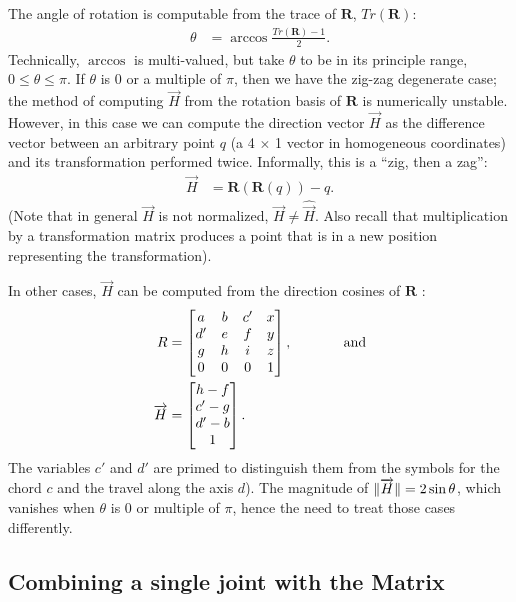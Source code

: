 \documentclass[mathematics,article,submit,pdftex,moreauthors]{Definitions/mdpi}
\DeclarePairedDelimiter{\norm}{\lVert}{\rVert}
\begin{document}
The angle of rotation is computable from the trace of $\bm{R}$, $Tr(\bm{R})$:
\begin{align}
  \theta &= \arccos{\frac{Tr(\bm{R}) - 1}{2}}.
\end{align}
Technically, $\arccos$ is multi-valued, but take $\theta$
to be in its principle range, $0 \leq \theta \leq \pi$.
If $\theta$ is $0$ or a multiple of $\pi$, then we have the zig-zag
degenerate case; the method of computing $\overrightarrow{H}$ from the rotation
basis of $\bm{R}$ is numerically unstable.
However, in this case
we can compute the direction vector $\overrightarrow{H}$ as the difference vector
between an arbitrary point $q$ (a 4 $\times$ 1 vector in homogeneous coordinates)
and its transformation performed
twice. Informally, this is a ``zig, then a zag'':
\begin{align}
  \overrightarrow{H} &= \bm{R} ( \bm{R}( q)) - q.
\end{align}
(Note that in general $\overrightarrow{H}$ is not normalized, $\overrightarrow{H} \neq \hat{\overrightarrow{H}}$.
Also recall that multiplication by a transformation matrix
produces a point that is in a new position representing
the transformation).

In other cases, $\overrightarrow{H}$ can be computed from the direction
cosines of $\bm{R}$ \cite{wiki:rotation}:
\begin{align}
  R &=     \begin{bmatrix} a & b & c' & x \\ d' & e & f & y\\ g & h & i & z\\ 0 &  0 & 0 & 1\end{bmatrix}, \text{ \hspace{3em} and} \\
    \overrightarrow{H} &=  \begin{bmatrix} h - f \\ c' - g \\ d' - b \\ 1 \end{bmatrix}.
\end{align}
The variables $c'$ and $d'$ are primed to distinguish them from
the symbols for the chord $c$ and the travel along the axis $d$).
The magnitude of $\norm{\overrightarrow{H}} = 2 \sin{\theta}$, which vanishes
when $\theta$ is $0$ or multiple of $\pi$, hence the need
to treat those cases differently.

\subsection{Combining a single joint with the Matrix}
\end{document}
